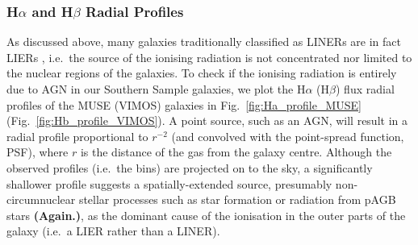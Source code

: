 \documentclass[a4paper,fleqn,usenatbib]{mnras}
\begin{document}

\subsubsection{H$\alpha$ and H$\beta$ Radial Profiles}
\label{subsubsec:Hb}

As discussed above, many galaxies traditionally classified as LINERs
are in fact LIERs \citep[see e.g.][]{Sarzi2005, Sarzi2010, Singh2013,
  Belfiore2016}, i.e.\ the source of the ionising radiation is not
concentrated nor limited to the nuclear regions of the galaxies. To
check if the ionising radiation is entirely due to AGN in our Southern
Sample galaxies, we plot the H$\alpha$ (H$\beta$) flux radial profiles
of the MUSE (VIMOS) galaxies in Fig.~\ref{fig:Ha_profile_MUSE}
(Fig.~\ref{fig:Hb_profile_VIMOS}). A point source, such as an AGN,
will result in a radial profile proportional to $r^{-2}$ (and
convolved with the point-spread function, PSF), where $r$ is the
distance of the gas from the galaxy centre. Although the observed
profiles (i.e.\ the bins) are projected on to the sky, a significantly
shallower profile suggests a spatially-extended source, presumably
non-circumnuclear stellar processes such as star formation or
radiation from pAGB stars {\bf (Again.)}, as the dominant cause of the
ionisation in the outer parts of the galaxy (i.e.\ a LIER rather than
a LINER).
\end{document}

